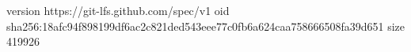 version https://git-lfs.github.com/spec/v1
oid sha256:18afc94f898199df6ac2c821ded543eee77c0fb6a624caa758666508fa39d651
size 419926
